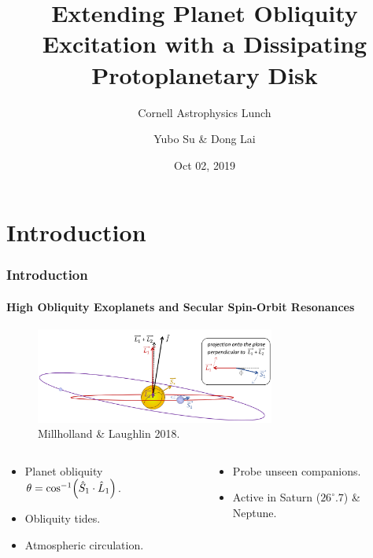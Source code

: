 \documentclass[dvipsnames]{beamer}
\DeclarePairedDelimiter\p{\lparen}{\rparen}
\begin{document}
\title[Disks \& Obliquities]{Extending Planet Obliquity Excitation with a
Dissipating Protoplanetary Disk}
\subtitle{Cornell Astrophysics Lunch}
\author{Yubo Su \& Dong Lai}
\date{Oct 02, 2019}

\maketitle

\section{Introduction}

\begin{frame}
    \frametitle{Introduction}
    \framesubtitle{High Obliquity Exoplanets and Secular Spin-Orbit Resonances}

    \begin{figure}[t]
        \centering
        \includegraphics[width=0.7\textwidth]{millholland_laughlin.png}
        \caption{Millholland \& Laughlin 2018.}
    \end{figure}
    \begin{columns}
        \begin{column}{0.5\textwidth}
            \begin{itemize}
                \item Planet obliquity $\theta = \cos^{-1}\p*{\hat{S}_1 \cdot
                    \hat{L}_1}$.
                \item Obliquity tides.
                \item Atmospheric circulation.
            \end{itemize}
        \end{column}
        \begin{column}{0.5\textwidth}
            \begin{itemize}
                \item Probe unseen companions.
                \item Active in Saturn ($26^\circ.7$) \& Neptune.
            \end{itemize}
        \end{column}
    \end{columns}
\end{frame}
\end{document}
